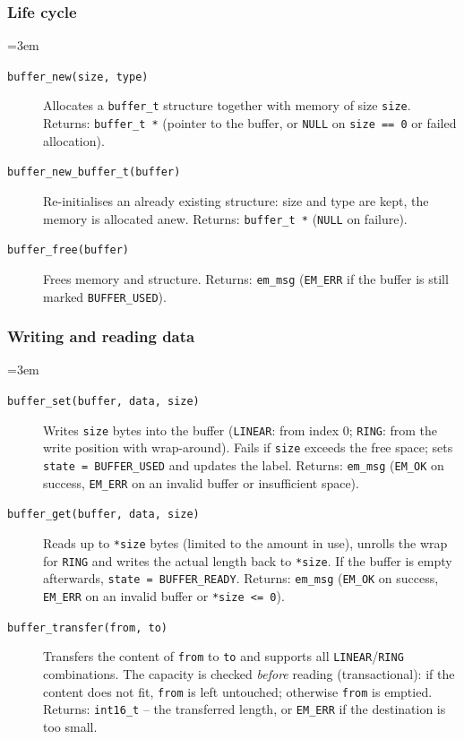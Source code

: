 \subsubsection*{Life cycle}
{\sloppy\emergencystretch=3em
\begin{description}
\item[\texttt{buffer\_new(size, type)}] Allocates a \verb|buffer_t| structure
  together with memory of size \verb|size|. Returns: \verb|buffer_t *| (pointer
  to the buffer, or \verb|NULL| on \verb|size == 0| or failed allocation).
\item[\texttt{buffer\_new\_buffer\_t(buffer)}] Re-initialises an already
  existing structure: size and type are kept, the memory is allocated anew.
  Returns: \verb|buffer_t *| (\verb|NULL| on failure).
\item[\texttt{buffer\_free(buffer)}] Frees memory and structure. Returns:
  \verb|em_msg| (\verb|EM_ERR| if the buffer is still marked
  \verb|BUFFER_USED|).
\end{description}
\par}

\subsubsection*{Writing and reading data}
{\sloppy\emergencystretch=3em
\begin{description}
\item[\texttt{buffer\_set(buffer, data, size)}] Writes \verb|size| bytes into
  the buffer (\verb|LINEAR|: from index $0$; \verb|RING|: from the write
  position with wrap-around). Fails if \verb|size| exceeds the free space;
  sets \verb|state = BUFFER_USED| and updates the label. Returns: \verb|em_msg|
  (\verb|EM_OK| on success, \verb|EM_ERR| on an invalid buffer or insufficient
  space).
\item[\texttt{buffer\_get(buffer, data, size)}] Reads up to \verb|*size| bytes
  (limited to the amount in use), unrolls the wrap for \verb|RING| and writes
  the actual length back to \verb|*size|. If the buffer is empty afterwards,
  \verb|state = BUFFER_READY|. Returns: \verb|em_msg| (\verb|EM_OK| on success,
  \verb|EM_ERR| on an invalid buffer or \verb|*size <= 0|).
\item[\texttt{buffer\_transfer(from, to)}] Transfers the content of \verb|from|
  to \verb|to| and supports all \verb|LINEAR|/\verb|RING| combinations. The
  capacity is checked \emph{before} reading (transactional): if the content
  does not fit, \verb|from| is left untouched; otherwise \verb|from| is
  emptied. Returns: \verb|int16_t| -- the transferred length, or \verb|EM_ERR|
  if the destination is too small.
\end{description}
\par}

